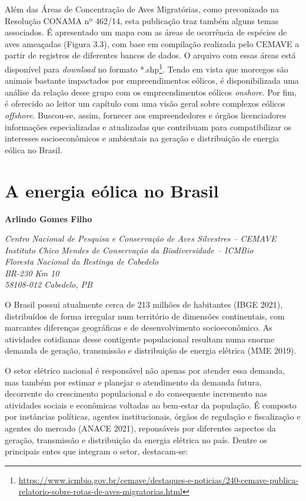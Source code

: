 \documentclass[
  oneside]{scrbook}
\DeclareRobustCommand{\href}[2]{#2\footnote{\url{#1}}}
\begin{document}
Além das Áreas de Concentração de Aves Migratórias, como preconizado na Resolução CONAMA nº 462/14, esta publicação traz também alguns temas associados. É apresentado um mapa com as áreas de ocorrência de espécies de aves ameaçadas (Figura 3.3), com base em compilação realizada pelo CEMAVE a partir de registros de diferentes bancos de dados. O arquivo com essas áreas está \href{https://www.icmbio.gov.br/cemave/destaques-e-noticias/240-cemave-publica-relatorio-sobre-rotas-de-aves-migratorias.html}{disponível para \emph{download} no formato *.shp}. Tendo em vista que morcegos são animais bastante impactados por empreendimentos eólicos, é disponibilizada uma análise da relação desse grupo com os empreendimentos eólicos \emph{onshore}. Por fim, é oferecido ao leitor um capítulo com uma visão geral sobre complexos eólicos \emph{offshore}. Buscou-se, assim, fornecer aos empreendedores e órgãos licenciadores informações especializadas e atualizadas que contribuam para compatibilizar os interesses socioeconômicos e ambientais na geração e distribuição de energia eólica no Brasil.

\hypertarget{cap1}{%
\chapter{A energia eólica no Brasil}\label{cap1}}

\pagestyle{headings}

\textbf{Arlindo Gomes Filho}

\emph{Centro Nacional de Pesquisa e Conservação de Aves Silvestres -- CEMAVE}\\
\emph{Instituto Chico Mendes de Conservação da Biodiversidade -- ICMBio}\\
\emph{Floresta Nacional da Restinga de Cabedelo}\\
\emph{BR-230 Km 10}\\
\emph{58108-012 Cabedelo, PB}

O Brasil possui atualmente cerca de 213 milhões de habitantes (IBGE 2021), distribuídos de forma irregular num território de dimensões continentais, com marcantes diferenças geográficas e de desenvolvimento socioeconômico. As atividades cotidianas desse contigente populacional resultam numa enorme demanda de geração, transmissão e distribuição de energia elétrica (MME 2019).

O setor elétrico nacional é responsável não apenas por atender essa demanda, mas também por estimar e planejar o atendimento da demanda futura, decorrente do crescimento populacional e do consequente incremento nas atividades sociais e econômicas voltadas ao bem-estar da população. É composto por instâncias políticas, agentes institucionais, órgãos de regulação e fiscalização e agentes do mercado (ANACE 2021), reponsáveis por diferentes aspectos da geração, transmissão e distribuição da energia elétrica no país. Dentre os principais entes que integram o setor, destacam-se:
\end{document}

